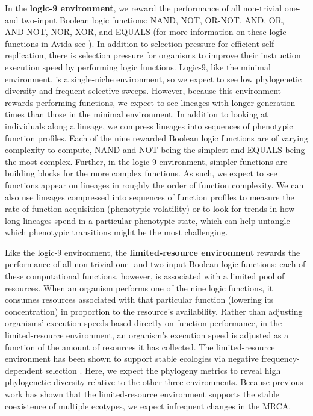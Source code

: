 \documentclass[letterpaper]{article}
\begin{document}
In the \textbf{logic-9 environment}, we reward the performance of all non-trivial one- and two-input Boolean logic functions: NAND, NOT, OR-NOT, AND, OR, AND-NOT, NOR, XOR, and EQUALS (for more information on these logic functions in Avida see \citealp{lenski_evolutionary_2003}). In addition to selection pressure for efficient self-replication, there is selection pressure for organisms to improve their instruction execution speed by performing logic functions. 
Logic-9, like the minimal environment, is a single-niche environment, so we expect to see low phylogenetic diversity and frequent selective sweeps. However, because this environment rewards performing functions, we expect to see lineages with longer generation times than those in the minimal environment. 
In addition to looking at individuals along a lineage, we compress lineages into sequences of phenotypic function profiles. Each of the nine rewarded Boolean logic functions are of varying complexity to compute, NAND and NOT being the simplest and EQUALS being the most complex. Further, in the logic-9 environment, simpler functions are building blocks for the more complex functions. 
As such, we expect to see functions appear on lineages in roughly the order of function complexity.
We can also use lineages compressed into sequences of function profiles to measure the rate of function acquisition (phenotypic volatility) or to look for trends in how long lineages spend in a particular phenotypic state, which can help untangle which phenotypic transitions might be the most challenging.


Like the logic-9 environment, the \textbf{limited-resource environment} rewards the performance of all non-trivial one- and two-input Boolean logic functions; each of these computational functions, however, is associated with a limited pool of resources. When an organism performs one of the nine logic functions, it consumes resources associated with that particular function (lowering its concentration) in proportion to the resource's availability. 
Rather than adjusting organisms' execution speeds based directly on function performance, in the limited-resource environment, an organism's execution speed is adjusted as a function of the amount of resources it has collected.
The limited-resource environment has been shown to support stable ecologies via negative frequency-dependent selection \citep{cooper_evolution_2003}. 
Here, we expect the phylogeny metrics to reveal high phylogenetic diversity relative to the other three environments. 
Because previous work has shown that the limited-resource environment supports the stable coexistence of multiple ecotypes, we expect infrequent changes in the MRCA.
\end{document}
